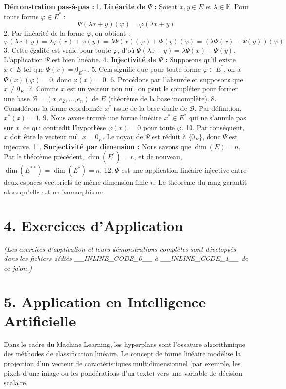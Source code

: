 \documentclass{report}
\begin{document}
\textbf{Démonstration pas-à-pas :}
1. \textbf{Linéarité de $\Psi$ :} Soient $x, y \in E$ et $\lambda \in \mathbb{K}$. Pour toute forme $\varphi \in E^*$ :
   $$ \Psi(\lambda x + y)(\varphi) = \varphi(\lambda x + y) $$
2. Par linéarité de la forme $\varphi$, on obtient :
   $$ \varphi(\lambda x + y) = \lambda \varphi(x) + \varphi(y) = \lambda \Psi(x)(\varphi) + \Psi(y)(\varphi) = (\lambda \Psi(x) + \Psi(y))(\varphi) $$
3. Cette égalité est vraie pour toute $\varphi$, d'où $\Psi(\lambda x + y) = \lambda \Psi(x) + \Psi(y)$. L'application $\Psi$ est bien linéaire.
4. \textbf{Injectivité de $\Psi$ :} Supposons qu'il existe $x \in E$ tel que $\Psi(x) = 0_{E^{**}}$.
5. Cela signifie que pour toute forme $\varphi \in E^*$, on a $\Psi(x)(\varphi) = 0$, donc $\varphi(x) = 0$.
6. Procédons par l'absurde et supposons que $x \neq 0_E$.
7. Comme $x$ est un vecteur non nul, on peut le compléter pour former une base $\mathcal{B} = (x, e_2, \dots, e_n)$ de $E$ (théorème de la base incomplète).
8. Considérons la forme coordonnée $x^*$ issue de la base duale de $\mathcal{B}$. Par définition, $x^*(x) = 1$.
9. Nous avons trouvé une forme linéaire $x^* \in E^*$ qui ne s'annule pas sur $x$, ce qui contredit l'hypothèse $\varphi(x) = 0$ pour toute $\varphi$.
10. Par conséquent, $x$ doit être le vecteur nul, $x = 0_E$. Le noyau de $\Psi$ est réduit à $\{0_E\}$, donc $\Psi$ est injective.
11. \textbf{Surjectivité par dimension :} Nous savons que $\dim(E) = n$. Par le théorème précédent, $\dim(E^*) = n$, et de nouveau, $\dim(E^{**}) = \dim(E^*) = n$.
12. $\Psi$ est une application linéaire injective entre deux espaces vectoriels de même dimension finie $n$. Le théorème du rang garantit alors qu'elle est un isomorphisme.

\section*{4. Exercices d'Application}

\textit{(Les exercices d'application et leurs démonstrations complètes sont développés dans les fichiers dédiés \_\_INLINE\_CODE\_0\_\_ à \_\_INLINE\_CODE\_1\_\_ de ce jalon.)}

\section*{5. Application en Intelligence Artificielle}

Dans le cadre du Machine Learning, les hyperplans sont l'ossature algorithmique des méthodes de classification linéaire. Le concept de forme linéaire modélise la projection d'un vecteur de caractéristiques multidimensionnel (par exemple, les pixels d'une image ou les pondérations d'un texte) vers une variable de décision scalaire.
\end{document}
